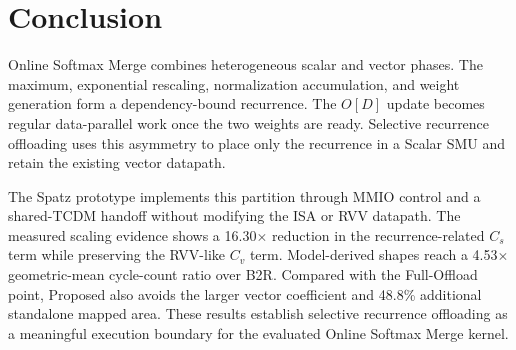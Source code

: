 \documentclass[journal]{IEEEtran}
\newcommand{\btor}{\mbox{B2R}}
\begin{document}
\section{Conclusion}

Online Softmax Merge combines heterogeneous scalar and vector phases. The
maximum, exponential rescaling, normalization accumulation, and weight
generation form a dependency-bound recurrence. The $O[D]$ update becomes
regular data-parallel work once the two weights are ready. Selective recurrence
offloading uses this asymmetry to place only the recurrence in a Scalar SMU
and retain the existing vector datapath.

The Spatz prototype implements this partition through MMIO control and a
shared-TCDM handoff without modifying the ISA or RVV datapath. The measured
scaling evidence shows a 16.30$\times$ reduction in the recurrence-related
$C_s$ term while preserving the RVV-like $C_v$ term. Model-derived shapes
reach a 4.53$\times$ geometric-mean cycle-count ratio over \btor{}. Compared
with the Full-Offload point, Proposed also avoids the larger vector coefficient
and 48.8\% additional standalone mapped area. These results establish
selective recurrence offloading as a meaningful execution boundary for the
evaluated Online Softmax Merge kernel.



\end{document}
